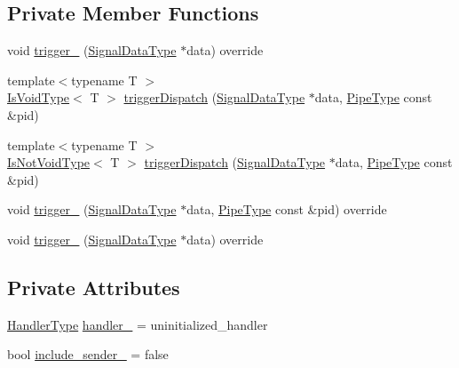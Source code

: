 \subsection*{Private Member Functions}
\begin{DoxyCompactItemize}
\item 
void \hyperlink{structvt_1_1pipe_1_1callback_1_1_callback_bcast_a839f195f5e4dae3251d67163016ae703}{trigger\+\_\+} (\hyperlink{structvt_1_1pipe_1_1callback_1_1_callback_bcast_aaf994b71056001334d30d74fa9c958f9}{Signal\+Data\+Type} $\ast$data) override
\item 
{\footnotesize template$<$typename T $>$ }\\\hyperlink{structvt_1_1pipe_1_1callback_1_1_callback_bcast_a3ca08c23824cfac76b837311a1d2c929}{Is\+Void\+Type}$<$ T $>$ \hyperlink{structvt_1_1pipe_1_1callback_1_1_callback_bcast_a8db0ff95fe319e739a93e87661365a5a}{trigger\+Dispatch} (\hyperlink{structvt_1_1pipe_1_1callback_1_1_callback_bcast_aaf994b71056001334d30d74fa9c958f9}{Signal\+Data\+Type} $\ast$data, \hyperlink{namespacevt_ac9852acda74d1896f48f406cd72c7bd3}{Pipe\+Type} const \&pid)
\item 
{\footnotesize template$<$typename T $>$ }\\\hyperlink{structvt_1_1pipe_1_1callback_1_1_callback_bcast_a3f5efa2edf7f4c47fe047e086e63a477}{Is\+Not\+Void\+Type}$<$ T $>$ \hyperlink{structvt_1_1pipe_1_1callback_1_1_callback_bcast_a6a0c65ef395baea684879a696e9fa8f1}{trigger\+Dispatch} (\hyperlink{structvt_1_1pipe_1_1callback_1_1_callback_bcast_aaf994b71056001334d30d74fa9c958f9}{Signal\+Data\+Type} $\ast$data, \hyperlink{namespacevt_ac9852acda74d1896f48f406cd72c7bd3}{Pipe\+Type} const \&pid)
\item 
void \hyperlink{structvt_1_1pipe_1_1callback_1_1_callback_bcast_a8c7fea2fd47017f1cd55f249ce5111a0}{trigger\+\_\+} (\hyperlink{structvt_1_1pipe_1_1callback_1_1_callback_bcast_aaf994b71056001334d30d74fa9c958f9}{Signal\+Data\+Type} $\ast$data, \hyperlink{namespacevt_ac9852acda74d1896f48f406cd72c7bd3}{Pipe\+Type} const \&pid) override
\item 
void \hyperlink{structvt_1_1pipe_1_1callback_1_1_callback_bcast_acc7d0eda09ac15644f876fdab691e269}{trigger\+\_\+} (\hyperlink{structvt_1_1pipe_1_1callback_1_1_callback_bcast_aaf994b71056001334d30d74fa9c958f9}{Signal\+Data\+Type} $\ast$data) override
\end{DoxyCompactItemize}
\subsection*{Private Attributes}
\begin{DoxyCompactItemize}
\item 
\hyperlink{namespacevt_af64846b57dfcaf104da3ef6967917573}{Handler\+Type} \hyperlink{structvt_1_1pipe_1_1callback_1_1_callback_bcast_a3ea3dbcdb923e07ef664094954313eb1}{handler\+\_\+} = uninitialized\+\_\+handler
\item 
bool \hyperlink{structvt_1_1pipe_1_1callback_1_1_callback_bcast_a143859ea6a28eec100d0e2b19d13b004}{include\+\_\+sender\+\_\+} = false
\end{DoxyCompactItemize}
